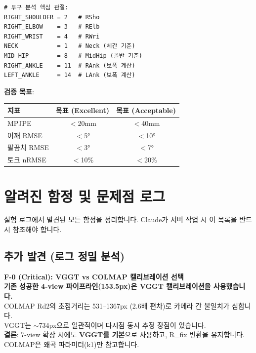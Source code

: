 \documentclass[11pt, a4paper]{report}
\begin{document}
\begin{codebox}[title={검증 대상 관절 인덱스 (OpenPose Body25)}]
\begin{verbatim}
# 투구 분석 핵심 관절:
RIGHT_SHOULDER = 2   # RSho
RIGHT_ELBOW    = 3   # RElb
RIGHT_WRIST    = 4   # RWri
NECK           = 1   # Neck (체간 기준)
MID_HIP        = 8   # MidHip (골반 기준)
RIGHT_ANKLE    = 11  # RAnk (보폭 계산)
LEFT_ANKLE     = 14  # LAnk (보폭 계산)
\end{verbatim}
\end{codebox}

\textbf{검증 목표}:
\begin{center}
\renewcommand{\arraystretch}{1.2}
\begin{tabular}{lcc}
\toprule
\textbf{지표} & \textbf{목표 (Excellent)} & \textbf{목표 (Acceptable)} \\
\midrule
MPJPE & $<$20mm & $<$40mm \\
어깨 RMSE & $<$5° & $<$10° \\
팔꿈치 RMSE & $<$3° & $<$7° \\
토크 nRMSE & $<$10\% & $<$20\% \\
\bottomrule
\end{tabular}
\end{center}


\chapter{알려진 함정 및 문제점 로그}

실험 로그에서 발견된 모든 함정을 정리합니다. Claude가 서버 작업 시 이 목록을 반드시 참조해야 합니다.

\section{추가 발견 (로그 정밀 분석)}

\begin{failbox}
\textbf{F-0 (Critical): VGGT vs COLMAP 캘리브레이션 선택}\\
\textbf{기존 성공한 4-view 파이프라인(153.5px)은 VGGT 캘리브레이션을 사용했습니다.}\\
COLMAP Rd2의 초점거리는 531--1367px (2.6배 편차)로 카메라 간 불일치가 심합니다.\\
VGGT는 $\sim$734px으로 일관적이며 다시점 동시 추정 장점이 있습니다.\\
\textbf{결론}: 7-view 확장 시에도 \textbf{VGGT를 기본}으로 사용하고, R\_fix 변환을 유지합니다.\\
COLMAP은 왜곡 파라미터(k1)만 참고합니다.
\end{failbox}
\end{document}

